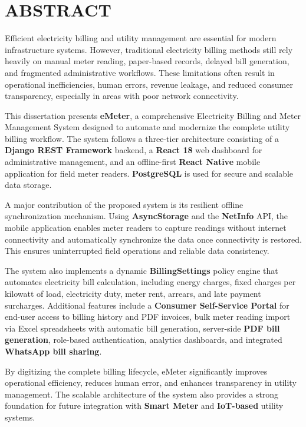 \documentclass[12pt, a4paper, onecolumn]{report}
\begin{document}
\newpage
\tableofcontents
\listoffigures
\listoftables

\newpage
\chapter*{ABSTRACT}

Efficient electricity billing and utility management are essential for modern infrastructure systems. However, traditional electricity billing methods still rely heavily on manual meter reading, paper-based records, delayed bill generation, and fragmented administrative workflows. These limitations often result in operational inefficiencies, human errors, revenue leakage, and reduced consumer transparency, especially in areas with poor network connectivity.

This dissertation presents \textbf{eMeter}, a comprehensive Electricity Billing and Meter Management System designed to automate and modernize the complete utility billing workflow. The system follows a three-tier architecture consisting of a \textbf{Django REST Framework} backend, a \textbf{React 18} web dashboard for administrative management, and an offline-first \textbf{React Native} mobile application for field meter readers. \textbf{PostgreSQL} is used for secure and scalable data storage.

A major contribution of the proposed system is its resilient offline synchronization mechanism. Using \textbf{AsyncStorage} and the \textbf{NetInfo} API, the mobile application enables meter readers to capture readings without internet connectivity and automatically synchronize the data once connectivity is restored. This ensures uninterrupted field operations and reliable data consistency.

The system also implements a dynamic \textbf{BillingSettings} policy engine that automates electricity bill calculation, including energy charges, fixed charges per kilowatt of load, electricity duty, meter rent, arrears, and late payment surcharges. Additional features include a \textbf{Consumer Self-Service Portal} for end-user access to billing history and PDF invoices, bulk meter reading import via Excel spreadsheets with automatic bill generation, server-side \textbf{PDF bill generation}, role-based authentication, analytics dashboards, and integrated \textbf{WhatsApp bill sharing}.

By digitizing the complete billing lifecycle, eMeter significantly improves operational efficiency, reduces human error, and enhances transparency in utility management. The scalable architecture of the system also provides a strong foundation for future integration with \textbf{Smart Meter} and \textbf{IoT-based} utility systems.
\end{document}
